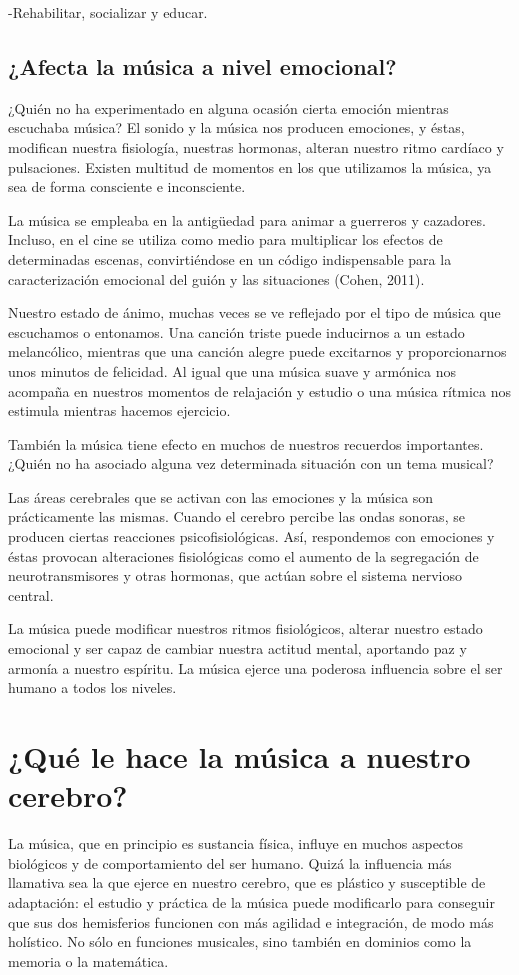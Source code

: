 \documentclass{bmcart}
\begin{document}
-Rehabilitar, socializar y educar.

\subsection*{¿Afecta la música a nivel emocional?}
¿Quién no ha experimentado en alguna ocasión cierta emoción mientras escuchaba música? El sonido y la música nos producen emociones, y éstas, modifican nuestra fisiología, nuestras hormonas, alteran nuestro ritmo cardíaco y pulsaciones. Existen multitud de momentos en los que utilizamos la música, ya sea de forma consciente e inconsciente.

La música se empleaba en la antigüedad para animar a guerreros y cazadores. Incluso, en el cine se utiliza como medio para multiplicar los efectos de determinadas escenas, convirtiéndose en un código indispensable para la caracterización emocional del guión y las situaciones (Cohen, 2011).

Nuestro estado de ánimo, muchas veces se ve reflejado por el tipo de música que escuchamos o entonamos. Una canción triste puede inducirnos a un estado melancólico, mientras que una canción alegre puede excitarnos y proporcionarnos unos minutos de felicidad. Al igual que una música suave y armónica nos acompaña en nuestros momentos de relajación y estudio o una música rítmica nos estimula mientras hacemos ejercicio.

También la música tiene efecto en muchos de nuestros recuerdos importantes. ¿Quién no ha asociado alguna vez determinada situación con un tema musical?

Las áreas cerebrales que se activan con las emociones y la música son prácticamente las mismas. Cuando el cerebro percibe las ondas sonoras, se producen ciertas reacciones psicofisiológicas. Así, respondemos con emociones y éstas provocan alteraciones fisiológicas como el aumento de la segregación de neurotransmisores y otras hormonas, que actúan sobre el sistema nervioso central.

La música puede modificar nuestros ritmos fisiológicos, alterar nuestro estado emocional y ser capaz de cambiar nuestra actitud mental, aportando paz y armonía a nuestro espíritu. La música ejerce una poderosa influencia sobre el ser humano a todos los niveles.
\section*{¿Qué le hace la música a nuestro cerebro?}
La música, que en principio es sustancia física, influye en muchos   aspectos biológicos y de comportamiento del ser humano. Quizá la influencia más llamativa sea la que ejerce en nuestro cerebro, que es plástico y susceptible de adaptación: el estudio y práctica de la música puede modificarlo para conseguir que sus dos hemisferios funcionen con más agilidad e integración, de modo más holístico. No sólo en funciones musicales, sino también en dominios como la memoria o la matemática.
\end{document}
